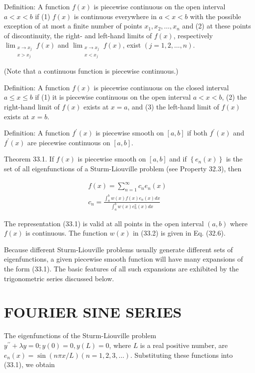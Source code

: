 \documentclass[10pt]{article}
\begin{document}
Definition: A function $f(x)$ is piecewise continuous on the open interval $a<x<b$ if (1) $f(x)$ is continuous everywhere in $a<x<b$ with the possible exception of at most a finite number of points $x_{1}, x_{2}, \ldots, x_{n}$ and (2) at these points of discontinuity, the right- and left-hand limits of $f(x)$, respectively $\lim _{\substack{x \rightarrow x_{j} \\ x>x_{j}}} f(x)$ and $\lim _{\substack{x \rightarrow x_{j} \\ x<x_{j}}} f(x)$, exist $(j=1,2, \ldots, n)$.

(Note that a continuous function is piecewise continuous.)

Definition: A function $f(x)$ is piecewise continuous on the closed interval $a \leq x \leq b$ if (1) it is piecewise continuous on the open interval $a<x<b$, (2) the right-hand limit of $f(x)$ exists at $x=a$, and (3) the left-hand limit of $f(x)$ exists at $x=b$.

Definition: A function $f^{\prime}(x)$ is piecewise smooth on $[a, b]$ if both $f^{\prime}(x)$ and $f^{\prime}(x)$ are piecewise continuous on $[a, b]$.

Theorem 33.1. If $f(x)$ is piecewise smooth on $[a, b]$ and if $\left\{e_{n}(x)\right\}$ is the set of all eigenfunctions of a Sturm-Liouville problem (see Property 32.3), then


\begin{gather*}
f(x)=\sum_{n=1}^{\infty} c_{n} e_{n}(x)  \tag{33.1}\\
c_{n}=\frac{\int_{a}^{b} w(x) f(x) e_{n}(x) d x}{\int_{a}^{b} w(x) e_{n}^{2}(x) d x} \tag{33.2}
\end{gather*}


The representation (33.1) is valid at all points in the open interval $(a, b)$ where $f(x)$ is continuous. The function $w(x)$ in (33.2) is given in Eq. (32.6).

Because different Sturm-Liouville problems usually generate different sets of eigenfunctions, a given piecewise smooth function will have many expansions of the form (33.1). The basic features of all such expansions are exhibited by the trigonometric series discussed below.

\section*{FOURIER SINE SERIES}
The eigenfunctions of the Sturm-Liouville problem $y^{\prime \prime}+\lambda y=0 ; y(0)=0, y(L)=0$, where $L$ is a real positive number, are $e_{n}(x)=\sin (n \pi x / L)(n=1,2,3, \ldots)$. Substituting these functions into (33.1), we obtain
\end{document}
